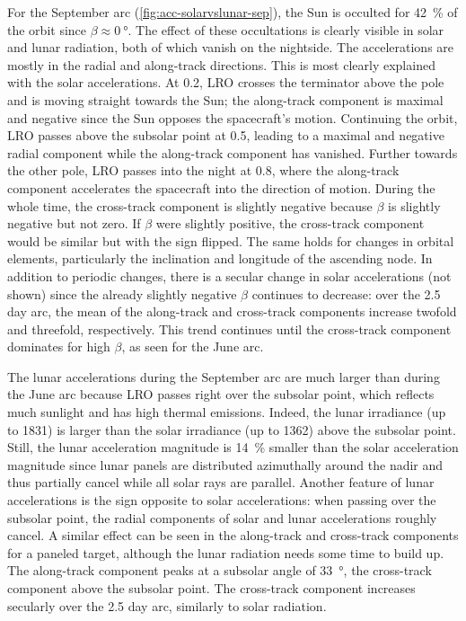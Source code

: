 For the September arc (\cref{fig:acc-solarvslunar-sep}), the Sun is occulted for \qty{42}{\percent} of the orbit since $\beta \approx \qty{0}{\degree}$. The effect of these occultations is clearly visible in solar and lunar radiation, both of which vanish on the nightside. The accelerations are mostly in the radial and along-track directions. This is most clearly explained with the solar accelerations. At 0.2, \gls{LRO} crosses the terminator above the pole and is moving straight towards the Sun; the along-track component is maximal and negative since the Sun opposes the spacecraft's motion. Continuing the orbit, \gls{LRO} passes above the subsolar point at 0.5, leading to a maximal and negative radial component while the along-track component has vanished. Further towards the other pole, \gls{LRO} passes into the night at 0.8, where the along-track component accelerates the spacecraft into the direction of motion. During the whole time, the cross-track component is slightly negative because $\beta$ is slightly negative but not zero. If $\beta$ were slightly positive, the cross-track component would be similar but with the sign flipped. The same holds for changes in orbital elements, particularly the inclination and longitude of the ascending node. In addition to periodic changes, there is a secular change in solar accelerations (not shown) since the already slightly negative $\beta$ continues to decrease: over the 2.5 day arc, the mean of the along-track and cross-track components increase twofold and threefold, respectively. This trend continues until the cross-track component dominates for high $\beta$, as seen for the June arc.

The lunar accelerations during the September arc are much larger than during the June arc because \gls{LRO} passes right over the subsolar point, which reflects much sunlight and has high thermal emissions. Indeed, the lunar irradiance (up to \qty{1831}{\irr}) is larger than the solar irradiance (up to \qty{1362}{\irr}) above the subsolar point. Still, the lunar acceleration magnitude is \qty{14}{\percent} smaller than the solar acceleration magnitude since lunar panels are distributed azimuthally around the nadir and thus partially cancel while all solar rays are parallel. Another feature of lunar accelerations is the sign opposite to solar accelerations: when passing over the subsolar point, the radial components of solar and lunar accelerations roughly cancel. A similar effect can be seen in the along-track and cross-track components for a paneled target, although the lunar radiation needs some time to build up. The along-track component peaks at a subsolar angle of \qty{33}{\degree}, the cross-track component above the subsolar point. The cross-track component increases secularly over the 2.5 day arc, similarly to solar radiation.

